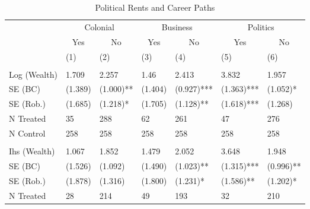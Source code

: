 \begin{table}[!h]

\caption{\label{tab:results_careerpaths}Political Rents and Career Paths}
\centering
\fontsize{10}{12}\selectfont
\begin{threeparttable}
\begin{tabular}[t]{lllllll}
\toprule
\multicolumn{1}{c}{ } & \multicolumn{2}{c}{Colonial} & \multicolumn{2}{c}{Business} & \multicolumn{2}{c}{Politics} \\
\cmidrule(l{3pt}r{3pt}){2-3} \cmidrule(l{3pt}r{3pt}){4-5} \cmidrule(l{3pt}r{3pt}){6-7}
\multicolumn{1}{c}{ } & \multicolumn{1}{c}{Yes} & \multicolumn{1}{c}{No} & \multicolumn{1}{c}{Yes} & \multicolumn{1}{c}{No} & \multicolumn{1}{c}{Yes} & \multicolumn{1}{c}{No} \\
\cmidrule(l{3pt}r{3pt}){2-2} \cmidrule(l{3pt}r{3pt}){3-3} \cmidrule(l{3pt}r{3pt}){4-4} \cmidrule(l{3pt}r{3pt}){5-5} \cmidrule(l{3pt}r{3pt}){6-6} \cmidrule(l{3pt}r{3pt}){7-7}
  & (1) & (2) & (3) & (4) & (5) & (6)\\
\midrule
\addlinespace[0.3em]
\multicolumn{7}{l}{\textbf{Without Covariates}}\\
\hspace{1em}Log (Wealth) & 1.709 & 2.257 & 1.46 & 2.413 & 3.832 & 1.957\\
\hspace{1em}SE (BC) & (1.389) & (1.000)** & (1.404) & (0.927)*** & (1.363)*** & (1.052)*\\
\hspace{1em}SE (Rob.) & (1.685) & (1.218)* & (1.705) & (1.128)** & (1.618)*** & (1.268)\\
\hspace{1em}N Treated & 35 & 288 & 62 & 261 & 47 & 276\\
\hspace{1em}N Control & 258 & 258 & 258 & 258 & 258 & 258\\
\addlinespace[0.3em]
\multicolumn{7}{l}{\textbf{With Covariates}}\\
\hspace{1em}Ihs (Wealth) & 1.067 & 1.852 & 1.479 & 2.052 & 3.648 & 1.948\\
\hspace{1em}SE (BC) & (1.526) & (1.092) & (1.490) & (1.023)** & (1.315)*** & (0.996)**\\
\hspace{1em}SE (Rob.) & (1.878) & (1.316) & (1.800) & (1.231)* & (1.586)** & (1.202)*\\
\hspace{1em}N Treated & 28 & 214 & 49 & 193 & 32 & 210\\

\end{tabular}
\end{threeparttable}
\end{table}

